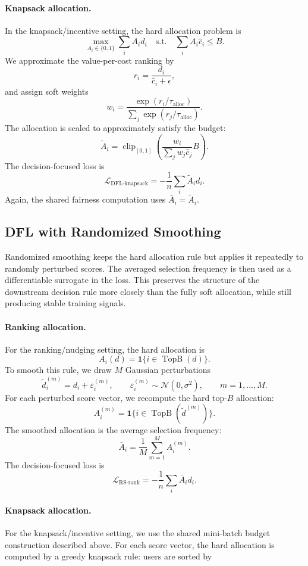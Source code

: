 \paragraph{Knapsack allocation.}
In the knapsack/incentive setting, the hard allocation problem is
\[
\max_{A_i\in\{0,1\}}
\sum_i A_i d_i
\quad
\text{s.t.}
\quad
\sum_i A_i \hat{c}_i \le B.
\]
We approximate the value-per-cost ranking by
\[
r_i = \frac{d_i}{\hat{c}_i+\epsilon},
\]
and assign soft weights
\[
w_i =
\frac{\exp(r_i/\tau_{\text{alloc}})}
{\sum_j \exp(r_j/\tau_{\text{alloc}})}.
\]
The allocation is scaled to approximately satisfy the budget:
\[
\tilde{A}_i
=
\operatorname{clip}_{[0,1]}
\left(
\frac{w_i}{\sum_j w_j \hat{c}_j}
B
\right).
\]
The decision-focused loss is
\[
\mathcal{L}_{\text{DFL-knapsack}}
=
-
\frac{1}{n}
\sum_i \tilde{A}_i d_i.
\]
Again, the shared fairness computation uses $\bar A_i=\tilde A_i$.

\subsection{DFL with Randomized Smoothing}
Randomized smoothing keeps the hard allocation rule but applies it repeatedly to randomly perturbed scores. The averaged selection frequency is then used as a differentiable surrogate in the loss. This preserves the structure of the downstream decision rule more closely than the fully soft allocation, while still producing stable training signals.

\paragraph{Ranking allocation.}
For the ranking/nudging setting, the hard allocation is
\[
A_i(d)
=
\mathbf{1}\{i\in\operatorname{TopB}(d)\}.
\]
To smooth this rule, we draw $M$ Gaussian perturbations
\[
\tilde d_i^{(m)} = d_i + \varepsilon_i^{(m)},
\qquad
\varepsilon_i^{(m)}\sim\mathcal{N}(0,\sigma^2),
\qquad
m=1,\dots,M.
\]
For each perturbed score vector, we recompute the hard top-$B$ allocation:
\[
A_i^{(m)}
=
\mathbf{1}\{i\in\operatorname{TopB}(\tilde d^{(m)})\}.
\]
The smoothed allocation is the average selection frequency:
\[
\bar A_i
=
\frac{1}{M}
\sum_{m=1}^M A_i^{(m)}.
\]
The decision-focused loss is
\[
\mathcal{L}_{\text{RS-rank}}
=
-
\frac{1}{n}
\sum_i \bar A_i d_i.
\]

 \paragraph{Knapsack allocation.}
For the knapsack/incentive setting, we use the shared mini-batch budget construction described above. For each score vector, the hard allocation is computed by a greedy knapsack rule: users are sorted by

